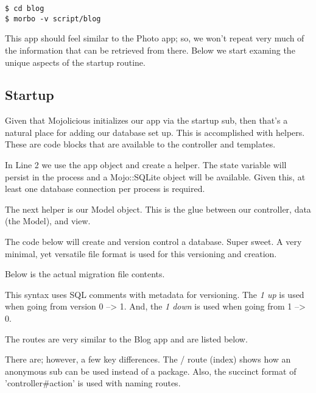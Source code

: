 \documentclass[14pt]{extreport}
\begin{document}
\begin{lstlisting}[style=BashInputStyle]
$ cd blog
$ morbo -v script/blog
\end{lstlisting}

This app should feel similar to the Photo app; so, we won't repeat very much of
the information that can be retrieved from there.  Below we start examing the
unique aspects of the startup routine.

\subsection{Startup}

Given that Mojolicious initializes our app via the startup sub, then that's a
natural place for adding our database set up.  This is accomplished with
helpers. These are code blocks that are available to the controller and
templates.



In Line 2 we use the app object and create a helper.  The state variable will
persist in the process and a Mojo::SQLite object will be available.  Given
this, at least one database connection per process is required.

The next helper is our Model object.  This is the glue between our controller,
data (the Model), and view.

The code below will create and version control a database.  Super sweet.  A
very minimal, yet versatile file format is used for this versioning and
creation.



Below is the actual migration file contents.



This syntax uses SQL comments with metadata for versioning.  The  \textit{1 up}
is used when going from version 0 --> 1.  And, the \textit{1 down} is used when
going from 1 --> 0.

The routes are very similar to the Blog app and are listed below.



There are; however, a few key differences.  The / route (index) shows how an
anonymous sub can be used instead of a package.  Also, the succinct format of
'controller\#action' is used with naming routes.  
\end{document}
